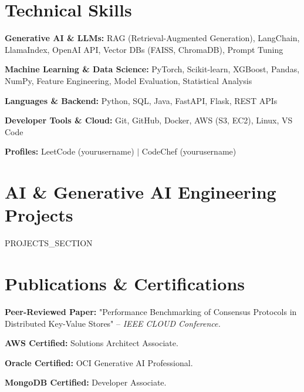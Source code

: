 \documentclass[letterpaper,11pt]{article}
\newcommand{\resumeSubHeadingListStart}{\begin{itemize}[leftmargin=0pt, label={}]\vspace{-2pt}}
\newcommand{\resumeSubHeadingListEnd}{\end{itemize}\vspace{-3pt}}
\begin{document}
\section{Technical Skills}
 \begin{itemize}[leftmargin=0pt, label={}, itemsep=2.0pt, parsep=0pt]\vspace{-3pt}
    \small{
      \item \textbf{Generative AI \& LLMs:} RAG (Retrieval-Augmented Generation), LangChain, LlamaIndex, OpenAI API, Vector DBs (FAISS, ChromaDB), Prompt Tuning
      \item \textbf{Machine Learning \& Data Science:} PyTorch, Scikit-learn, XGBoost, Pandas, NumPy, Feature Engineering, Model Evaluation, Statistical Analysis
      \item \textbf{Languages \& Backend:} Python, SQL, Java, FastAPI, Flask, REST APIs
      \item \textbf{Developer Tools \& Cloud:} Git, GitHub, Docker, AWS (S3, EC2), Linux, VS Code
      \item \textbf{Profiles:} LeetCode (yourusername) $|$ CodeChef (yourusername)
    }
 \end{itemize}\vspace{-3pt}

\section{AI \& Generative AI Engineering Projects}
    \resumeSubHeadingListStart
{{PROJECTS_SECTION}}
    \resumeSubHeadingListEnd

\section{Publications \& Certifications}
 \begin{itemize}[leftmargin=0pt, label={}, itemsep=1.5pt, parsep=0pt]\vspace{-3pt}
    \small{
      \item \textbf{Peer-Reviewed Paper:} "Performance Benchmarking of Consensus Protocols in Distributed Key-Value Stores" -- \emph{IEEE CLOUD Conference.}
      \item \textbf{AWS Certified:} Solutions Architect Associate.
      \item \textbf{Oracle Certified:} OCI Generative AI Professional.
      \item \textbf{MongoDB Certified:} Developer Associate.
    }
 \end{itemize}\vspace{-3pt}

\end{document}

